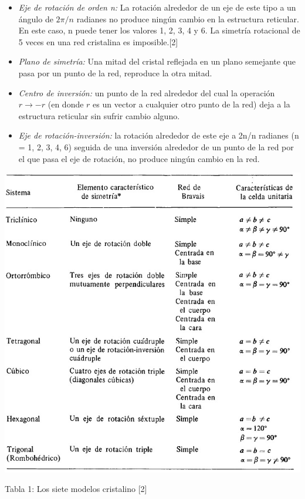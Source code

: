 \documentclass[12pt,a4paper]{article}
\begin{document}
\begin{itemize}
	
	\item \textit{Eje de rotación de orden n:} La rotación alrededor de un eje de este tipo a un ángulo de $2\pi / n$ radianes no produce ningún cambio en la estructura reticular. En este caso, n puede tener los valores 1, 2, 3, 4 y 6. La simetría rotacional de 5 veces en una red cristalina es imposible.[2]
	
	\vspace{0.2cm}
	
	\item \textit{Plano de simetría:} Una mitad del cristal reflejada en un plano semejante que pasa por un punto de la red, reproduce la otra mitad.
	
	\vspace{0.2cm}
	
	\item \textit{Centro de inversión:}   un punto de la red alrededor del cual la operación $r\longrightarrow - r$ (en donde $r$ es un vector a cualquier otro punto de la red) deja a la estructura reticular sin sufrir cambio alguno.
	
	\vspace{0.2cm}
	
	\item \textit{Eje de rotación-inversión:} la rotación alrededor de este eje a 2n/n radianes (n = 1, 2, 3, 4, 6) seguida de una inversión alrededor de un punto de la red
	por el que pasa el eje de rotación, no produce ningún cambio en la red.
\end{itemize}

\newpage


 \begin{center}
	\includegraphics[width=0.85\linewidth]{F1}
\end{center}
\begin{center}
	Tabla 1: Los siete modelos cristalino [2]
\end{center}
\end{document}
